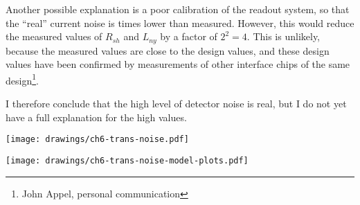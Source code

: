Another possible explanation is a poor calibration of the readout system, so that the ``real'' current noise is  times lower than measured.
However, this would reduce the measured values of $R_{sh}$ and $L_{ny}$ by a factor of $2^2=4$.
This is unlikely, because the measured values are close to the design values, and these design values have been confirmed by measurements of other interface chips of the same design\footnote{John Appel, personal communication}.

I therefore conclude that the high level of detector noise is real, but I do not yet have a full explanation for the high values.

\begin{figure*}
  \centering
\texttt{[image: drawings/ch6-trans-noise.pdf]}
\caption[Detector noise measurements]{
Plots showing detector noise for the four detectors with working heaters on column 0.
The left column plots the directly measured current noise, after removing a common mode signal, at eight bias points from 25k to 32k.
The right column shows the same noise spectra, but referred to power absorbed in the bolometer.
For all four detectors, there is less spread in the low-frequency power noise than in the current noise, suggesting that the dominant source of noise at these frequencies deposits power on the bolometers.
This behavior is expected of either thermal fluctuation noise or photon noise.
Also plotted in the right column is the predicted noise spectrum, using parameters taken from , including  of photon noise.
For all four detectors, the measured noise is higher than predicted by the noise model.
}
\label{fig:ch6-trans-noise}
\end{figure*}

\begin{figure*}
  \centering
\texttt{[image: drawings/ch6-trans-noise-model-plots.pdf]}
\caption[Measured and modeled noise]{
  Plot showing measured noise for , referred to power absorbed in bolometer, along with two noise models.
The red line is the basic detector noise model using measured values for all detector parameters as described in this chapter, including predicted  of photon noise.
The black line is for a noise model that include enough excess ``power'' noise to match the measured white noise level at low frequencies.
This excess ``power'' noise could be due to a high level of photon noise (1.9 times higher than predicted) or a larger-than-measured value of $G$ (4.8 times higher than measured), or some combination of the two.
}
\label{fig:ch6-trans-noise-model-plots}
\end{figure*}

